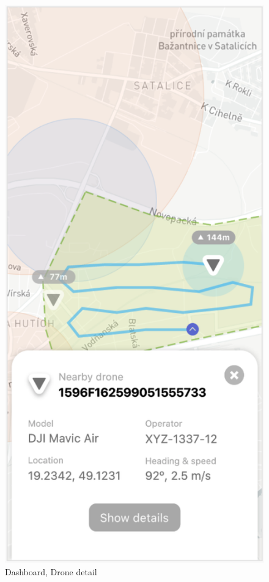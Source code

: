 \begin{figure}
\begin{minipage}{.4\textwidth}
        \includegraphics[width=.7\linewidth]{assets/user_interface_design/dashboard/dashboard_drone_detail.png}
        \caption{Dashboard, Drone detail}
        \label{fig:dashboard_drone_detail}
    \end{minipage}
    \label{fig:dashboard_all}
\end{figure}
